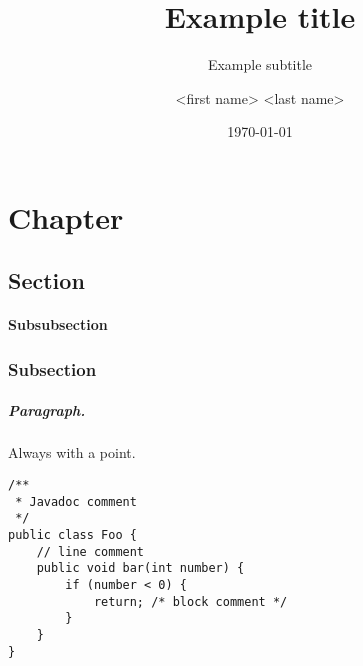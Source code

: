 \documentclass{seal_thesis}
\date{\today}
\title{Example title}
\subtitle{Example subtitle}
\author{<first name> <last name>}
\begin{document}
\maketitle

\frontmatter


\begin{abstract}
\end{abstract}

\begin{zusammenfassung}
\end{zusammenfassung}

\tableofcontents
\listoffigures
\listoftables
\lstlistoflistings

\mainmatter
\chapter{Chapter}
\section{Section}
%
\subsubsection{Subsubsection}

\subsection{Subsection}
%
\paragraph{Paragraph.} Always with a point.

\begin{lstlisting}[caption=An example code snippet]
/**
 * Javadoc comment
 */
public class Foo {
	// line comment
	public void bar(int number) {
		if (number < 0) {
			return; /* block comment */
		}
	}
}
\end{lstlisting}

\backmatter


\end{document}
